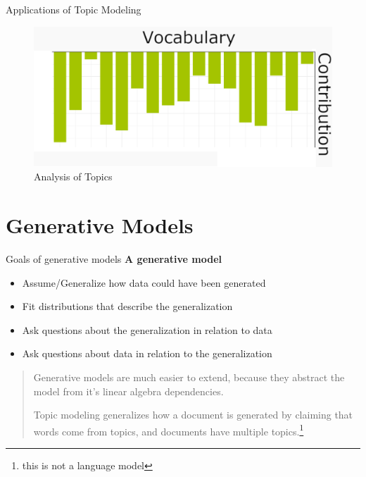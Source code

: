 \documentclass[10pt]{beamer}
\begin{document}
\begin{frame}{Applications of Topic Modeling}
\begin{multicols}{4}
\begin{figure}
  \includegraphics[width=\columnwidth]{bar-simple.png}
  \caption{Analysis of Topics}
  \end{figure}

  \end{multicols}

\end{frame}


\section{Generative Models}
\begin{frame}{Goals of generative models}
  {\bf A generative model}

  \begin{itemize}
  \item Assume/Generalize how data could have been generated
  \item Fit distributions that describe the generalization
  \item Ask questions about the generalization in relation to data
  \item Ask questions about data in relation to the generalization
  \end{itemize}

  \vspace{1em}

  \begin{quote}
    Generative models are much easier to extend, because they abstract the model from it's linear algebra dependencies.

    \vspace{1em}

  Topic modeling generalizes how a document is generated by claiming that words come from topics, and documents have multiple topics.\footnote{this is not a language model} %

  \end{quote}

\end{frame}
\end{document}

